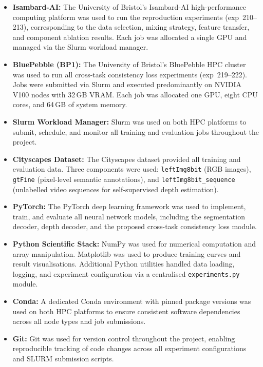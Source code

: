 \documentclass[
  oneside,
  author={Shijie Lu},
  degree={BSc},
  title={Label-Efficient Semantic Segmentation via Self-Supervised Depth Estimation and Cross-Task Consistency},
  unit={COMS30045},
  subtitle={}
]{dissertation}
\begin{document}
\begin{itemize}

    \item \textbf{Isambard-AI:} The University of Bristol's
    Isambard-AI high-performance computing platform was used to run the
    reproduction experiments (exp~210--213), corresponding to the data
    selection, mixing strategy, feature transfer, and component ablation
    results. Each job was allocated a single GPU and managed via the
    Slurm workload manager.

    \item \textbf{BluePebble (BP1):} The University of Bristol's
    BluePebble HPC cluster was used to run all cross-task consistency
    loss experiments (exp~219--222). Jobs were submitted via Slurm and
    executed predominantly on NVIDIA V100 nodes with 32\,GB VRAM.
    Each job was allocated one GPU, eight CPU cores, and 64\,GB of
    system memory.

    \item \textbf{Slurm Workload Manager:} Slurm was used on both HPC
    platforms to submit, schedule, and monitor all training and
    evaluation jobs throughout the project.

    \item \textbf{Cityscapes Dataset:} The Cityscapes dataset provided
    all training and evaluation data. Three components were used:
    \texttt{leftImg8bit} (RGB images), \texttt{gtFine} (pixel-level
    semantic annotations), and \texttt{leftImg8bit\_sequence} (unlabelled
    video sequences for self-supervised depth estimation).

    \item \textbf{PyTorch:} The PyTorch deep learning framework was used
    to implement, train, and evaluate all neural network models, including
    the segmentation decoder, depth decoder, and the proposed cross-task
    consistency loss module.

    \item \textbf{Python Scientific Stack:} NumPy was used for numerical
    computation and array manipulation. Matplotlib was used to produce
    training curves and result visualisations. Additional Python utilities
    handled data loading, logging, and experiment configuration via a
    centralised \texttt{experiments.py} module.

    \item \textbf{Conda:} A dedicated Conda environment with pinned
    package versions was used on both HPC platforms to ensure consistent
    software dependencies across all node types and job submissions.

    \item \textbf{Git:} Git was used for version control throughout the
    project, enabling reproducible tracking of code changes across all
    experiment configurations and SLURM submission scripts.

\end{itemize}
\end{document}
